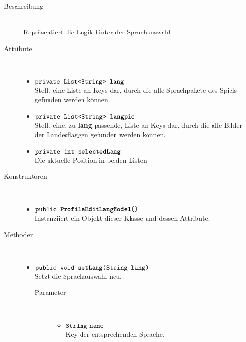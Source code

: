 \begin{description}
\item[Beschreibung] \hfill \\ Repräsentiert die Logik hinter der Sprachauswahl

\item[Attribute] \hfill \\
	\vspace{-.8cm}
	\begin{itemize}
		\item $\texttt{private List<String> \textbf{lang}}$ \\ Stellt eine Liste an Keys dar, durch die alle Sprachpakete des Spiels gefunden werden können.
		\item $\texttt{private List<String> \textbf{langpic}}$ \\ Stellt eine, zu \textbf{lang} passende, Liste an Keys dar, durch die alle Bilder der Landesflaggen gefunden werden können.
		\item $\texttt{private int \textbf{selectedLang}}$ \\ Die aktuelle Position in beiden Listen.
	\end{itemize}
	
\item[Konstruktoren] \hfill \\
	\vspace{-.8cm}
	\begin{itemize}
		\item $\texttt{public \textbf{ProfileEditLangModel}()}$ \\ Instanziiert ein Objekt dieser Klasse und dessen Attribute.
	\end{itemize}
	
\item[Methoden] \hfill \\
	\vspace{-.8cm}
	\begin{itemize}		
		\item $\texttt{public void \textbf{setLang}(String lang)}$ \\ Setzt die Sprachauswahl neu.
		\begin{description}
			\item[Parameter] \hfill \\
			\vspace{-.8cm}
			\begin{itemize}
				\item $\texttt{String name}$ \\ Key der entsprechenden Sprache.
			\end{itemize}
		\end{description}
		

\end{itemize}
\end{description}
